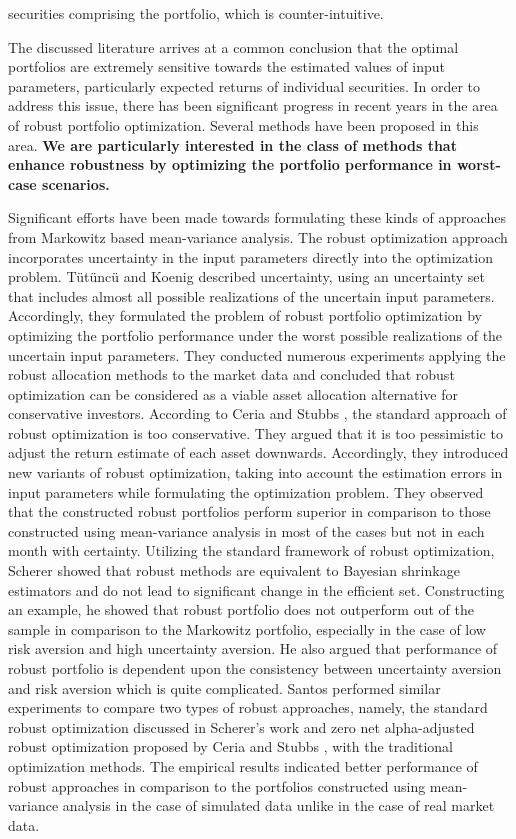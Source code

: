 securities comprising the portfolio, which is counter-intuitive.

The discussed literature arrives at a common conclusion that the optimal portfolios are extremely sensitive towards the estimated values of input parameters, particularly expected returns of individual securities. In order to address this issue, there has been significant progress in recent years in the area of robust portfolio optimization. Several methods have been proposed in this area. \textbf{We are particularly interested in the class of methods that enhance robustness by optimizing the portfolio performance in worst-case scenarios.} 

Significant efforts have been made towards formulating these kinds of approaches from Markowitz based mean-variance analysis. The robust optimization approach incorporates uncertainty in the input parameters directly into the optimization problem. T{\"u}t{\"u}nc{\"u} and Koenig \cite{tutuncu} described uncertainty, using an uncertainty set that includes almost all possible realizations of the uncertain input parameters. Accordingly, they formulated the problem of robust portfolio optimization by optimizing the portfolio performance under the worst possible realizations of the uncertain input parameters. They conducted numerous experiments applying the robust allocation methods to the market data and concluded that robust optimization can be considered as a viable asset allocation alternative for conservative investors.
According to Ceria and Stubbs \cite{Ceria}, the standard approach of robust optimization is too conservative. They argued that it is too pessimistic to adjust
the return estimate of each asset downwards. Accordingly, they introduced new variants of robust optimization, taking into account the estimation errors in input parameters while formulating the optimization problem. They observed that the constructed robust portfolios perform superior in comparison to those constructed using mean-variance analysis in most of the cases but not in each month with certainty. Utilizing the standard framework of robust optimization, Scherer \cite{Scherer} showed that robust methods are equivalent to Bayesian shrinkage estimators and do not lead to significant change in the efficient set. Constructing an example, he showed that robust portfolio does not outperform out of the sample in comparison to the Markowitz portfolio, especially in the case of low risk aversion and high uncertainty aversion. He also argued that performance of robust portfolio is dependent upon the consistency between uncertainty aversion and risk aversion which is quite complicated. Santos \cite{santos} performed similar experiments to compare two types of robust approaches, namely, the standard robust optimization discussed in Scherer's work \cite{Scherer} and zero net alpha-adjusted robust optimization proposed by Ceria and Stubbs \cite{Ceria}, with the traditional optimization methods. The empirical results indicated better performance of robust approaches in comparison to the portfolios constructed using mean-variance analysis in the case of simulated data unlike in the case of real market data. 


